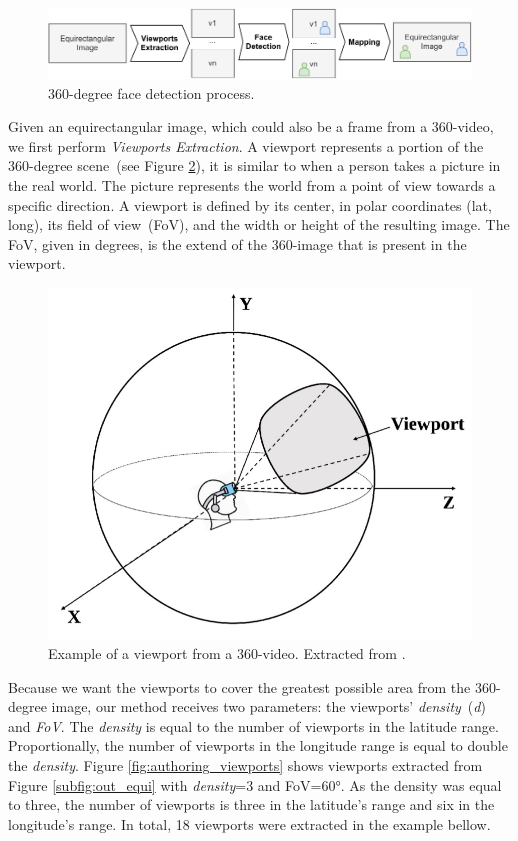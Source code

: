 \begin{figure}[!ht]
    \centering
    \includegraphics[width=1\linewidth]{img/video360/360facedetection.pdf}
    \caption{360-degree face detection process.}
    \label{fig:360_face_detection}
\end{figure}

Given an equirectangular image, which could also be a frame from a 360-video, we first perform \emph{Viewports Extraction}. A viewport represents a portion of the 360-degree scene~(see Figure \ref{fig:authoring_exviewport}), it is similar to when a person takes a picture in the real world. The picture represents the world from a point of view towards a specific direction. A viewport is defined by its center, in polar coordinates (lat, long), its field of view~(FoV), and the width or height of the resulting image. The FoV, given in degrees, is the extend of the 360-image that is present in the viewport.

\begin{figure}[!ht]
    \centering
    \includegraphics[width=0.5\linewidth]{img/video360/viewport.jpg}
    \caption{Example of a viewport from a 360-video. Extracted from \cite{nguyen2020evaluation}.}
    \label{fig:authoring_exviewport}
\end{figure}

Because we want the viewports to cover the greatest possible area from the 360-degree image, our method receives two parameters: the viewports' \emph{density}~(\emph{d}) and \emph{FoV}. The \emph{density} is equal to the number of viewports in the latitude range. Proportionally, the number of viewports in the longitude range is equal to double the \emph{density}. Figure \ref{fig:authoring_viewports} shows viewports extracted from Figure \ref{subfig:out_equi} with \emph{density}=3 and FoV=60°. As the density was equal to three, the number of viewports is three in the latitude's range and six in the longitude's range. In total, 18 viewports were extracted in the example bellow.

